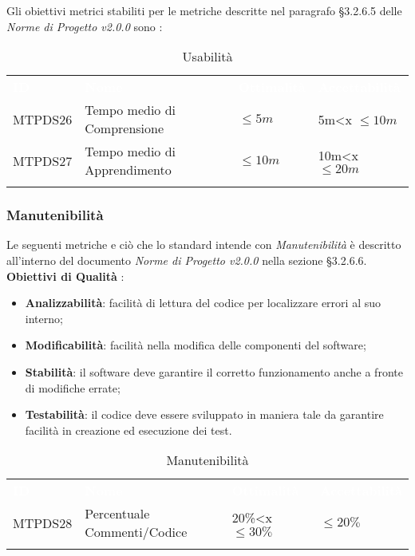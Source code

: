 Gli obiettivi metrici stabiliti per le metriche descritte nel paragrafo §3.2.6.5 delle \textit{Norme di Progetto v2.0.0} sono : 

\begin{longtable}{|C{.15\textwidth}|C{.24\textwidth}|C{.24\textwidth}|C{.24\textwidth}|}
\hline
{}\textbf{\textcolor{white}{ID}} & \textbf{\textcolor{white}{Nome}} & \textbf{\textcolor{white}{Ottimalità}} & \textbf{\textcolor{white}{Accettabilità}}\\
MTPDS26 & Tempo medio di Comprensione & $\leq 5m$ & 5m<x $\leq 10m$\\
\hline
{}MTPDS27 & Tempo medio di Apprendimento & $\leq 10m$ & 10m<x $\leq 20m$ \\ 
\hline
\caption{Usabilità}
\label{Usabilità}
\end{longtable}

\subsubsection{Manutenibilità}

Le seguenti metriche e ciò che lo standard intende con \textit{Manutenibilità} è descritto all'interno del documento \textit{Norme di Progetto v2.0.0} nella sezione §3.2.6.6. \\

\textbf{Obiettivi di Qualità} :

\begin{itemize}
	\item \textbf{Analizzabilità}: facilità di lettura del codice per localizzare errori al suo interno; 
	\item \textbf{Modificabilità}: facilità nella modifica delle componenti del software;
	\item \textbf{Stabilità}: il software deve garantire il corretto funzionamento anche a fronte di modifiche errate;
	\item \textbf{Testabilità}: il codice deve essere sviluppato in maniera tale da garantire facilità in creazione ed esecuzione dei test.
\end{itemize}

\begin{longtable}{|C{.15\textwidth}|C{.24\textwidth}|C{.24\textwidth}|C{.24\textwidth}|}
\hline
{}\textbf{\textcolor{white}{ID}} & \textbf{\textcolor{white}{Nome}} & \textbf{\textcolor{white}{Ottimalità}} & \textbf{\textcolor{white}{Accettabilità}}\\
MTPDS28 & Percentuale Commenti/Codice & 20\%<x $\leq 30\%$ & $\leq 20\%$\\
\hline

\caption{Manutenibilità}
\label{Manutenibilità}
\end{longtable}


